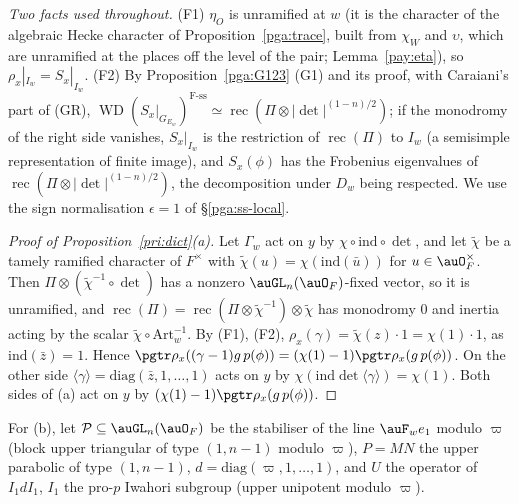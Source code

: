 \documentclass[10pt]{amsart}
\theoremstyle{definition}
\theoremstyle{remark}
\begin{document}
\emph{Two facts used throughout.} (F1) $\eta_O$ is unramified at $w$ (it is the character of the
algebraic Hecke character of Proposition~\ref{pga:trace}, built from $\chi_W$ and $\upsilon$, which
are unramified at the places off the level of the pair; Lemma~\ref{pay:eta}), so
$\rho_x|_{I_w}=S_x|_{I_w}$. (F2) By
Proposition~\ref{pga:G123} (G1) and its proof, with Caraiani's part of (GR),
$\operatorname{WD}(S_x|_{G_{E_w}})^{\mathrm{F\text{-}ss}}\simeq\operatorname{rec}(\Pi\otimes|\det|^{(1-n)/2})$;
if the monodromy of the right side vanishes, $S_x|_{I_w}$ is the restriction of
$\operatorname{rec}(\Pi)$ to $I_w$ (a semisimple representation of finite image), and $S_x(\phi)$ has
the Frobenius eigenvalues of $\operatorname{rec}(\Pi\otimes|\det|^{(1-n)/2})$, the decomposition
under $D_w$ being respected. We use the sign normalisation $\epsilon=1$ of \S\ref{pga:ss-local}.

\begin{proof}[Proof of Proposition~\ref{pri:dict}(a)]
Let $\Gamma_w$ act on $y$ by $\chi\circ\mathrm{ind}\circ\det$, and let $\tilde\chi$ be a tamely
ramified character of $F^\times$ with $\tilde\chi(u)=\chi(\mathrm{ind}(\bar u))$ for $u\in
\auO_F^\times$. Then $\Pi\otimes(\tilde\chi^{-1}\circ\det)$ has a nonzero $\auGL_n(\auO_F)$-fixed
vector, so it is unramified, and $\operatorname{rec}(\Pi)=\operatorname{rec}(\Pi\otimes
\tilde\chi^{-1})\otimes\tilde\chi$ has monodromy $0$ and inertia acting by the scalar
$\tilde\chi\circ\mathrm{Art}_w^{-1}$. By (F1), (F2), $\rho_x(\gamma)=\tilde\chi(z)\cdot1=\chi(1)\cdot1$,
as $\mathrm{ind}(\bar z)=1$. Hence $\pgtr\rho_x((\gamma-1)g\,p(\phi))=(\chi(1)-1)\pgtr\rho_x(g\,p(\phi))$.
On the other side $\langle\gamma\rangle=\mathrm{diag}(\bar z,1,\dots,1)$ acts on $y$ by
$\chi(\mathrm{ind}\det\langle\gamma\rangle)=\chi(1)$. Both sides of (a) act on $y$ by
$(\chi(1)-1)\pgtr\rho_x(g\,p(\phi))$.
\end{proof}

For (b), let $\mathcal P\subseteq\auGL_n(\auO_F)$ be the stabiliser of the line $\auF_we_1$ modulo
$\varpi$ (block upper triangular of type $(1,n-1)$ modulo $\varpi$), $P=MN$ the upper parabolic of
type $(1,n-1)$, $d=\mathrm{diag}(\varpi,1,\dots,1)$, and $U$ the operator of $I_1dI_1$, $I_1$ the
pro-$p$ Iwahori subgroup (upper unipotent modulo $\varpi$).
\end{document}
